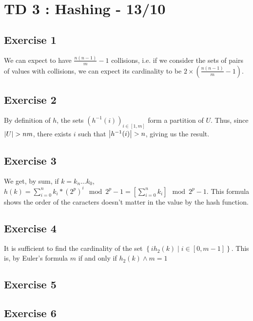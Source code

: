 \documentclass{cours}
\begin{document}
\section{TD 3 : Hashing - 13/10}
\subsection{Exercise 1}
We can expect to have $\frac{n(n-1)}{m} - 1$ collisions, i.e. if we consider the sets of pairs of values with collisions, we can expect its cardinality to be $2\times (\frac{n(n-1)}{m} - 1)$.

\subsection{Exercise 2}
By definition of $h$, the sets $\left(h^{-1}(i)\right)_{i \in \left[1, m\right]}$ form a partition of $U$. Thus, since $\left|U\right| > nm$, there exists $i$ such that $\left|h^{-1}(i)\right| > n$, giving us the result. 

\subsection{Exercise 3}
We get, by sum, if $k = k_{n}\ldots k_{0}$, $h(k) = \sum_{i = 0}^{n} k_{i}*(2^{p})^{i} \mod 2^{p}-1 = \left[\sum_{i = 0}^{n} k_{i}\right] \mod 2^{p}-1$. This formula shows the order of the caracters doesn't matter in the value by the hash function.

\subsection{Exercise 4}
It is sufficient to find the cardinality of the set $\left\{ih_{2}(k) \mid i \in \left[0, m-1\right]\right\}$. This is, by Euler's formula $m$ if and only if $h_{2}(k) \wedge m = 1$

\subsection{Exercise 5}

\subsection{Exercise 6}
\end{document}
